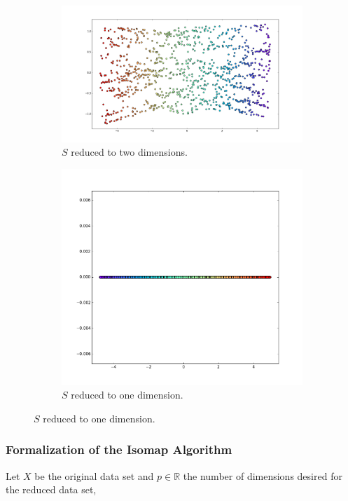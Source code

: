 \documentclass[12pt]{article}
\begin{document}
\begin{figure}[H]
    \begin{subfigure}{.5\linewidth}
		\centering
		\captionsetup{justification=centering}
		\includegraphics[width=\linewidth]{studying_isomap/embedding_2}
		\caption{$S$ reduced to two dimensions.}
		\label{fig:mani_s_reduced_1}
	\end{subfigure}%
	\begin{subfigure}{.5\linewidth}
		\centering
		\captionsetup{justification=centering}
		\includegraphics[width=.63\linewidth]{studying_isomap/embedding_1}
		\caption{$S$ reduced to one dimension.}
		\label{fig:mani_s_reduced_2}
	\end{subfigure}
\end{figure}

\newpage
\subsubsection{Formalization of the Isomap Algorithm}

Let $X$ be the original data set and $p \in \mathbb{R}$ the number of dimensions desired for the reduced data set, \cite{ten2000}
\end{document}
